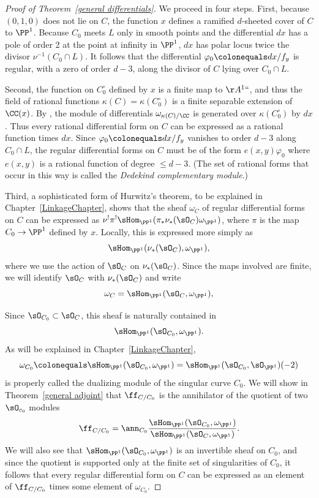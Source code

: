 \begin{proof}[Proof of Theorem~\ref{general differentials}]
We proceed in four steps.
First, because  $(0,1,0)$ does not lie on $C$,
the function $x$ defines a
ramified $d$-sheeted cover of $C$ to $\PP^{1}$. Because $C_{0}$ meets $L$
only in smooth
points and the differential $dx$ has a pole of order 2 at the point at
infinity in $\PP^{1}$,
$dx$
has polar locus twice the divisor $ \nu^{-1}(C_{0}\cap L)$. It follows
that
the differential
$\varphi_0 \colonequals  dx/f_{y}$ is regular, with a zero of order $d-3$,
along the divisor of $C$ lying over $C_0\cap L$.

Second, the function on $C^\circ_0$ defined by $x$
is a finite map to $\AA^1` `$, and thus the field of rational functions
$\kappa(C) = \kappa(C^\circ_0)$ is a finite
separable extension of $\CC(x)$. By \cite[Section 16.5]{Eisenbud1995},
the module of differentials
$\omega_{\kappa(C)/\CC}$ is generated over $\kappa(C^\circ_0)$ by
$dx$. Thus every rational
differential form on $C$ can be expressed as a rational function
times $dx$. Since $\varphi_{0} \colonequals  dx/f_{y}$ vanishes to order
$d-3$ along $C_{0}\cap L$,
the regular differential forms on $C$ must be of the form
$e(x,y)\varphi_{0}$ where
$e(x,y)$ is a rational function of degree $\leq d-3$. (The set of rational
forms that occur in this
%
way is called the
\emph{Dedekind complementary module}.)

Third,
a sophisticated form of Hurwitz's theorem,
to be
explained in
Chapter~\ref{LinkageChapter},
shows that the sheaf $\omega_{C}$ of regular differential forms on $C$
can be expressed as $\nu^{!}\pi^{!}\sHom_{\PP^{1}}(\pi_{*}\nu_{*}(\sO_{C})
\omega_{\PP^{1}})$, where $\pi$ is the map $C_{0}\to \PP^{1}$ defined by $x$.
Locally, this is expressed more simply as
$$
\sHom_{\PP^{1}}(\nu_{*}(\sO_{C}), \omega_{\PP^{1}}),
$$
where we use the action of $\sO_{C}$ on $\nu_{*}(\sO_{C})$.
 Since the maps involved are finite,
we will  identify $\sO_{C}$  with $\nu_{*}(\sO_{C})$
 and write
$$
\omega_{C} = \sHom_{\PP^{1}}(\sO_{C}, \omega_{\PP^{1}}),
$$

Since $\sO_{C_{0}}\subset \sO_{C}$, this sheaf is naturally
contained
in
$$
 \sHom_{\PP^{1}}(\sO_{C_{0}}, \omega_{\PP^{1}}).
$$
As will be explained in Chapter~\ref{LinkageChapter},
$$
\omega_{C_{0}}\colonequals  \sHom_{\PP^{1}}(\sO_{C_{0}}, \omega_{\PP^{1}})
=
\sHom_{\PP^{1}}(\sO_{C_{0}}, \sO_{\PP^{1}})(-2)
$$
 is properly called the
dualizing module
%
of the singular curve $C_{0}$.
We will show in Theorem~\ref{general adjoint} that
$\ff_{C/C_{0}} $ is the annihilator of the quotient of two $\sO_{c_{0}}$ modules
\vspace*{3pt}
$$
\vspace*{3pt}
\ff_{C/C_{0}} = \ann_{C_{0}}
\frac{\sHom_{\PP^{1}}(\sO_{C_{0}}, \omega_{\PP^{1}})}
{\sHom_{\PP^{1}}(\sO_{C}, \omega_{\PP^{1}})}.
$$
We will also see that $\sHom_{\PP^{1}}(\sO_{C_{0}}, \omega_{\PP^{1}})$
is an invertible sheaf on $C_{0}$, and since the quotient is supported only
at the finite set of singularities of $C_{0}$, it follows that every regular differential form on $C$ can be expressed as an
element of $\ff_{C/C_{0}} $
times some element of $\omega_{C_{0}}$.


\end{proof}
